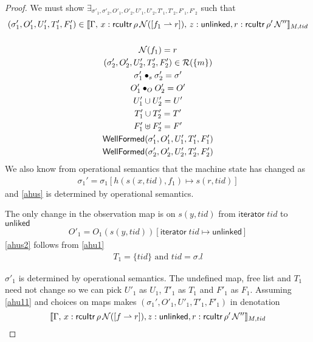 \begin{proof}
We must show  $\exists_{\sigma'_1,\sigma'_2, O'_{1}, O'_{2}, U'_{1}, U'_{2}, T'_{1}, T'_{2}, F'_1,F'_2}$ such that
\begin{gather}\label{phu5}
\begin{aligned}
(\sigma_1',O'_{1},U'_{1}, T'_{1},F'_1)  \in \llbracket \Gamma, \,  x:\mathsf{rcuItr} \, \rho \,\mathcal{N}([f_1 \rightharpoonup r]) ,\, z:\mathsf{unlinked}, r:\mathsf{rcuItr} \, \rho' \, \mathcal{N}'' \rrbracket_{M,tid}
\end{aligned}\\
\\
\label{phuN}
\mathcal{N}(f_1)= r
\\
\label{phu6}
(\sigma_2',O'_{2},U'_{2}, T'_{2}, F'_2) \in \mathcal{R}(\{m\})
\\
\label{ahusig'}
\sigma'_1 \bullet_s \sigma'_2 = \sigma' \\
\label{phu7}
O'_{1} \bullet_{O} O'_{2} = O'
\\
\label{phu8}
U'_{1} \cup U'_{2} = U'
\\
\label{phu9}
T'_{1} \cup T'_{2} = T'
\\
\label{phff}
F'_{1} \uplus F'_2 = F'
\\
\label{phu10}
\textsf{WellFormed}(\sigma_1',O'_{1},U'_{1},T'_{1},F'_1) \\
\label{phu11}
\textsf{WellFormed}(\sigma_2',O'_{2},U'_{2},T'_{2},F'_2)
\end{gather}
We also know from operational semantics that the machine state has changed as
\begin{gather}\label{ahus}
\sigma_1' =  \sigma_1[h(s(x,tid),f_1 ) \mapsto s(r,tid) ]
\end{gather}
and \ref{ahus} is determined by operational semantics. 

The only change in the observation map is on $s(y,tid)$ from $\textsf{iterator}\;tid$ to $\textsf{unliked}$
\begin{gather}\label{ahus1}
  O'_1 =  O_1(s(y,tid))[\textsf{iterator}\;tid \mapsto \textsf{unlinked}]
\end{gather}
\ref{ahus2} follows from \ref{ahu1}
\begin{gather}\label{ahus2}
  T_1 = \{tid\} \text{ and } tid = \sigma.l
\end{gather}

$\sigma'_1$ is determined by operational semantics. The undefined map, free list and $T_1$ need not change so we can pick $U'_1$ as $U_1$, $T'_1$ as $T_1$ and $F'_1$ as $F_1$. Assuming \ref{ahu11} and choices on maps makes $(\sigma_1',O'_{1},U'_{1}, T'_{1},F'_1)$ in denotation
\[\llbracket \Gamma, \,  x:\mathsf{rcuItr} \, \rho \,\mathcal{N}([ f \rightharpoonup r]), z:\mathsf{unlinked}, r:\mathsf{rcuItr} \, \rho' \, \mathcal{N}'' \rrbracket_{M,tid}\]


\end{proof}
